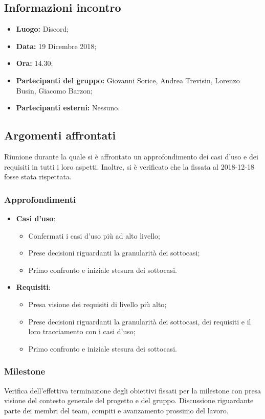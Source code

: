 \subsection{Informazioni incontro}
\begin{itemize}
	\item { \textbf{Luogo:} Discord;  }
	\item { \textbf{Data:} 19 Dicembre 2018; }
	\item { \textbf{Ora:} 14.30; }
	\item { \textbf{Partecipanti del gruppo:} Giovanni Sorice, Andrea Trevisin, Lorenzo Busin, Giacomo Barzon; }
	\item { \textbf{Partecipanti esterni:} Nessuno. }
\end{itemize}


\subsection{Argomenti affrontati}
Riunione durante la quale si è affrontato un approfondimento dei casi d'uso e dei requisiti in tutti i loro aspetti. Inoltre, si è verificato che la  fissata al 2018-12-18 fosse stata rispettata.

\subsubsection{Approfondimenti}
\begin{itemize}
	\item {\textbf{Casi d'uso}}:
	\begin{itemize}
			\item Confermati i casi d'uso più ad alto livello;		
			\item Prese decisioni riguardanti la granularità dei sottocasi;
			\item Primo confronto e iniziale stesura dei sottocasi.
	\end{itemize}
	\item {\textbf{Requisiti}}:
	\begin{itemize}
		\item Presa visione dei requisiti di livello più alto;		
		\item Prese decisioni riguardanti la granularità dei sottocasi, dei requisiti e il loro tracciamento con i casi d'uso;
		\item Primo confronto e iniziale stesura dei sottocasi.
	\end{itemize}
\end{itemize}

\subsubsection{Milestone}
Verifica dell'effettiva terminazione degli obiettivi fissati per la milestone con presa visione del contesto generale del progetto e del gruppo. Discussione riguardante parte dei membri del team, compiti e avanzamento prossimo del lavoro.

